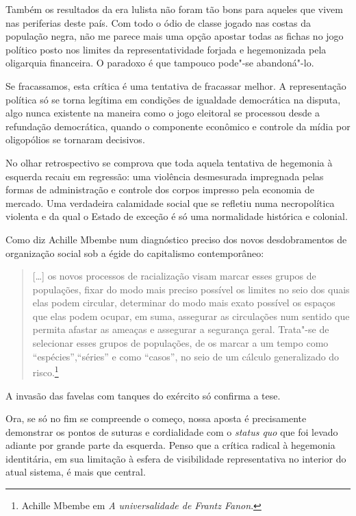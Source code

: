 Também os resultados da era lulista não foram tão bons para aqueles que
vivem nas periferias deste país. Com todo o ódio de classe jogado nas
costas da população negra, não me parece mais uma opção apostar todas as
fichas no jogo político posto nos limites da representatividade forjada
e hegemonizada pela oligarquia financeira. O paradoxo é que tampouco
pode"-se abandoná"-lo.

Se fracassamos, esta crítica é uma tentativa de fracassar melhor.
A representação política só se
torna legítima em condições de igualdade democrática na disputa, algo
nunca existente na maneira como o jogo eleitoral se processou desde a
refundação democrática, quando o componente econômico e controle da
mídia por oligopólios se tornaram decisivos.

No olhar retrospectivo se comprova que toda aquela tentativa de
hegemonia à esquerda recaiu em regressão: uma violência desmesurada
impregnada pelas formas de administração e controle dos corpos impresso
pela economia de mercado. Uma verdadeira calamidade social que se
refletiu numa necropolítica violenta e da qual o Estado de exceção é só
uma normalidade histórica e colonial.

Como diz Achille Mbembe num diagnóstico preciso dos novos desdobramentos
de organização social sob a égide do capitalismo contemporâneo:

\begin{quote}
{[}\ldots{}{]} os novos processos de racialização visam marcar esses grupos
de populações, fixar do modo mais preciso possível os limites no seio
dos quais elas podem circular, determinar do modo mais exato possível os
espaços que elas podem ocupar, em suma, assegurar as circulações num
sentido que permita afastar as ameaças e assegurar a segurança geral.
Trata"-se de selecionar esses grupos de populações, de os marcar a um
tempo como ``espécies'',``séries'' e como ``casos'', no seio de um cálculo
generalizado do risco.\footnote{Achille Mbembe em \emph{A universalidade
  de Frantz Fanon}.}
\end{quote}

A invasão das favelas com tanques do exército só confirma a tese.

Ora, se só no fim se compreende o começo, nossa aposta é precisamente
demonstrar os pontos de suturas e cordialidade com o \emph{status quo}
que foi levado adiante por grande parte da esquerda. Penso que a crítica
radical à hegemonia identitária, em sua limitação à esfera de
visibilidade representativa no interior do atual sistema, é mais que
central.

